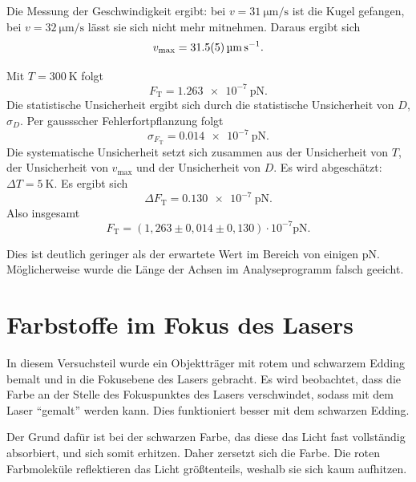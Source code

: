 Die Messung der Geschwindigkeit ergibt: bei $v=\SI{31}{\micro\meter\per\second}$ ist die Kugel gefangen, bei $v=\SI{32}{\micro\meter\per\second}$ lässt sie sich nicht mehr mitnehmen. Daraus ergibt sich
\begin{equation}
 v_{\textrm{max}} = \SI{31,5\pm0,5}{\micro\meter\per\second}.
\end{equation}

Mit $T=\SI{300}{\kelvin}$ folgt
\begin{equation}
 F_{\textrm{T}} =  \SI{1,263e-7}{\pico\newton}.
\end{equation}
Die statistische Unsicherheit ergibt sich durch die statistische Unsicherheit von $D$, $\sigma_{D}$. Per gaussscher Fehlerfortpflanzung folgt
\begin{equation}
 \sigma_{F_{\textrm{T}}} = \SI{0,014e-7}{\pico\newton}.
\end{equation}
Die systematische Unsicherheit setzt sich zusammen aus der Unsicherheit von $T$, der Unsicherheit von $v_{\textrm{max}}$ und der Unsicherheit von $D$. Es wird abgeschätzt: $\Delta T = \SI{5}{\kelvin}$.
Es ergibt sich
\begin{equation}
 \Delta F_{\textrm{T}} = \SI{0,130e-7}{\pico\newton}.
\end{equation}
Also insgesamt
\begin{equation}
 F_{\textrm{T}} = (1,263\pm0,014\pm0,130)\cdot 10^{-7} \si{\pico\newton}.
\end{equation}

Dies ist deutlich geringer als der erwartete Wert im Bereich von einigen $\si{\pico\newton}$. Möglicherweise wurde die Länge der Achsen im Analyseprogramm falsch geeicht.

\section{Farbstoffe im Fokus des Lasers}

In diesem Versuchsteil wurde ein Objektträger mit rotem und schwarzem Edding bemalt und in die Fokusebene des Lasers gebracht. Es wird beobachtet, dass die Farbe an der Stelle des Fokuspunktes des Lasers verschwindet, sodass mit dem Laser ``gemalt'' werden kann. Dies funktioniert besser mit dem schwarzen Edding.

Der Grund dafür ist bei der schwarzen Farbe, das diese das Licht fast vollständig absorbiert, und sich somit erhitzen. Daher zersetzt sich die Farbe. Die roten Farbmoleküle reflektieren das Licht größtenteils, weshalb sie sich kaum aufhitzen. 

